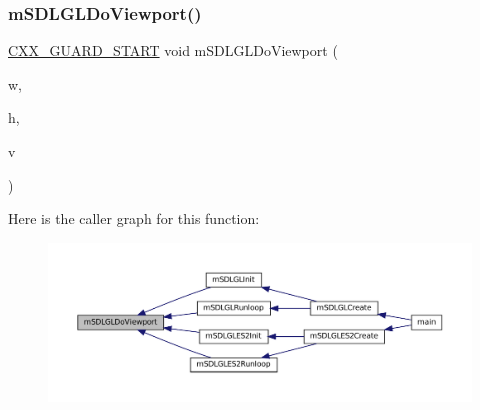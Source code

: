 \subsubsection{\texorpdfstring{m\+S\+D\+L\+G\+L\+Do\+Viewport()}{mSDLGLDoViewport()}}
{\footnotesize\ttfamily \mbox{\hyperlink{__builder_8h_af721f4bd9a2c3267a89d3967b3ca1747}{C\+X\+X\+\_\+\+G\+U\+A\+R\+D\+\_\+\+S\+T\+A\+RT}} void m\+S\+D\+L\+G\+L\+Do\+Viewport (\begin{DoxyParamCaption}\item[{\mbox{\hyperlink{ioapi_8h_a787fa3cf048117ba7123753c1e74fcd6}{int}}}]{w,  }\item[{\mbox{\hyperlink{ioapi_8h_a787fa3cf048117ba7123753c1e74fcd6}{int}}}]{h,  }\item[{struct \mbox{\hyperlink{struct_video_backend}{Video\+Backend}} $\ast$}]{v }\end{DoxyParamCaption})}

Here is the caller graph for this function\+:
\nopagebreak
\begin{figure}[H]
\begin{center}
\leavevmode
\includegraphics[width=350pt]{gl-common_8h_a85812103de7937a9b1affd22665bd01c_icgraph}
\end{center}
\end{figure}
